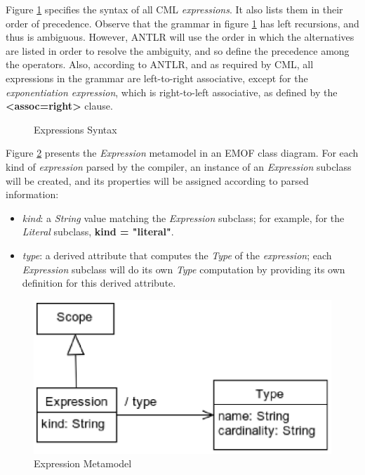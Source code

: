 Figure \ref{fig:stx:expressions} specifies the syntax of all CML \emph{expressions}.
It also lists them in their order of precedence.
Observe that the grammar in figure \ref{fig:stx:expressions} has left
recursions, and thus is ambiguous.
However, ANTLR \cite{antlr} will use the order in which the alternatives
are listed in order to resolve the ambiguity,
and so define the precedence among the operators.
Also, according to ANTLR,
and as required by CML,
all expressions in the grammar are left-to-right associative,
except for the \emph{exponentiation expression},
which is right-to-left associative,
as defined by the \textbf{<assoc=right>} clause.

\begin{figure}
\verbatimfont{\small}

\caption{Expressions Syntax}
\label{fig:stx:expressions}
\end{figure}

Figure \ref{fig:meta:expression} presents the \emph{Expression} metamodel
in an EMOF \cite{mof} class diagram.
For each kind of \emph{expression} parsed by the compiler,
an instance of an \emph{Expression} subclass will be created,
and its properties will be assigned
according to parsed information:

\begin{itemize}

\item \emph{kind}:
a \emph{String} value matching the \emph{Expression} subclass;
for example, for the \emph{Literal} subclass, \textbf{kind = "literal"}.

\item \emph{type}:
a derived attribute that computes the \emph{Type} of the \emph{expression};
each \emph{Expression} subclass will do its own \emph{Type} computation
by providing its own definition for this derived attribute.

\end{itemize}

\begin{figure}
\includegraphics[width=\textwidth]{metamodel/expression}
\caption{Expression Metamodel}
\label{fig:meta:expression}
\end{figure}
